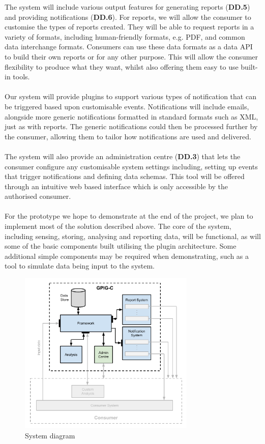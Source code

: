 \documentclass[10pt,a4paper]{article}
\begin{document}
The system will include various output features for generating reports (\textbf{DD.5}) and providing notifications (\textbf{DD.6}). For reports, we will allow the consumer to customise the types of reports created. They will be able to request reports in a variety of formats, including human-friendly formats, e.g. PDF, and common data interchange formats. Consumers can use these data formats as a data API to build their own reports or for any other purpose. This will allow the consumer flexibility to produce what they want, whilst also offering them easy to use built-in tools.
\\ \\
Our system will provide plugins to support various types of notification that can be triggered based upon customisable events. Notifications will include  emails, alongside more generic notifications formatted in standard formats such as XML, just as with reports. The generic notifications could then be processed further by the consumer, allowing them to tailor how notifications are used and delivered.
\\ \\
The system will also provide an administration centre (\textbf{DD.3}) that lets the consumer configure any customisable system settings including, setting up events that trigger notifications and defining data schemas. This tool will be offered through an intuitive web based interface which is only accessible by the authorised consumer.
\\ \\
For the prototype we hope to demonstrate at the end of the project, we plan to implement most of the solution described above. The core of the system, including sensing, storing, analysing and reporting data, will be functional, as will some of the basic components built utilising the plugin architecture. Some additional simple components may be required when demonstrating, such as a tool to simulate data being input to the system. 



\begin{figure}[hptb]
  \centering
\includegraphics[width=0.75\textwidth]{system-architecture.pdf}
  \caption{System diagram}
\end{figure}
\end{document}

